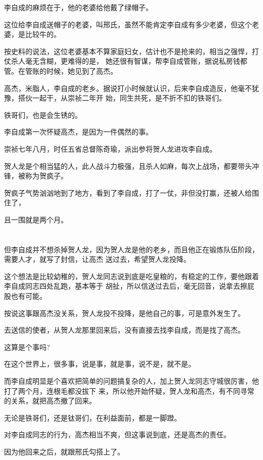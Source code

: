 \documentclass[11pt,a4paper,onecolumn]{article}
\begin{document}
李自成的麻烦在于，他的老婆给他戴了绿帽子。

这位给李自成送帽子的老婆，叫邢氏，虽然不能肯定李自成有多少老婆，但这个老婆，是比较牛的。

按史料的说法，这位老婆基本不算家庭妇女，估计也不是抢来的，相当之强悍，打仗杀人毫无含糊，更难得的是，
她还很有智谋，帮李自成管账，据说私房钱都管。在管账的时候，她见到了高杰。

高杰，米脂人，李自成的老乡。据说打小时候就认识，后来李自成造反，他毫不犹豫，搭伙一起干，从崇祯二年开
始，同生共死，是不折不扣的铁哥们。

铁哥们，也是会生锈的。

李自成第一次怀疑高杰，是因为一件偶然的事。

崇祯七年八月，时任五省总督陈奇瑜，派出参将贺人龙进攻李自成。

贺人龙是个相当猛的人，此人战斗力极强，且杀人如麻，每次上战场，都要带头冲锋，被称为贺疯子。

贺疯子气势汹汹地到了地方，看到了李自成，打了一仗，非但没打赢，还被人给围住了，

且一围就是两个月。

\section[\thesection]{}

但李自成并不想杀掉贺人龙，因为贺人龙是他的老乡，而且他正在锻炼队伍阶段，需要人才，就写了封信，让高杰
送过去，希望贺人龙投降。

这个想法是比较幼稚的，贺人龙同志说到底是吃皇粮的，有稳定的工作，要他跟着李自成同志四处乱跑，基本等于
胡扯，所以信送过去后，毫无回音，说拿去擦屁股也有可能。

按说这事跟高杰没关系，贺人龙投不投降，是他自己的事，可是意外发生了。

去送信的使者，从贺人龙那里回来后，没有直接去找李自成，而是找了高杰。

这算是个事吗?

在这个世界上，很多事，说是事，就是事，说不是，就不是。

而李自成明显是个喜欢把简单的问题搞复杂的人，加上贺人龙同志守城很厉害，他打了两个月，连根毛都没拔下
来，所以他开始怀疑，贺人龙和高杰，有不同寻常的关系，就把高杰撤了回来。

无论是铁哥们，还是钛哥们，在利益面前，都是一脚蹬。

对李自成同志的行为，高杰相当不爽，但这事说到底，还是高杰的责任。

因为他回来之后，就跟邢氏勾搭上了。
\end{document}
